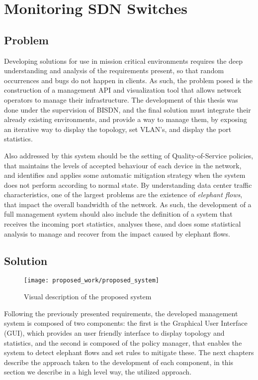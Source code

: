 \chapter{Monitoring SDN Switches} \label{chap:mon_sdn} %

\section {Problem}

Developing solutions for use in mission critical environments requires the deep understanding and analysis of the requirements present, so that random occurrences and bugs do not happen in clients. As such, the problem posed is 
the construction of a management API and visualization tool that allows network operators to manage their infrastructure. The development of this thesis was done under the supervision of BISDN, and the final solution must 
integrate their already existing environments, and provide a way to manage them, by exposing an iterative way to display the topology, set VLAN's, and display the port statistics. 

\par Also addressed by this system should be the setting of Quality-of-Service policies, that maintains the levels of accepted behaviour of each device in the network, and identifies and applies some automatic mitigation
strategy when the system does not perform according to normal state. By understanding data center traffic characteristics, one of the largest problems are the existence of \textit{elephant flows}, that impact the
overall bandwidth of the network. As such, the development of a full management system should also include the definition of a system that receives the incoming port statistics, analyses these, and does some statistical analysis to
manage and recover from the impact caused by elephant flows.

\section {Solution}

\begin{figure} [h]
    \centering
    \texttt{[image: proposed\_work/proposed\_system]}
    \caption{Visual description of the proposed system} \label {fig:pro_sys}
\end{figure}

Following the previously presented requirements, the developed management system is composed of two components: the first is the  Graphical User Interface (GUI), which provides an user friendly interface to display topology and 
statistics, and the second is composed of the policy manager, that enables the system to detect elephant flows and set rules to mitigate these. The next chapters describe the approach taken to the development of each component,
in this section we describe in a high level way, the utilized approach.

